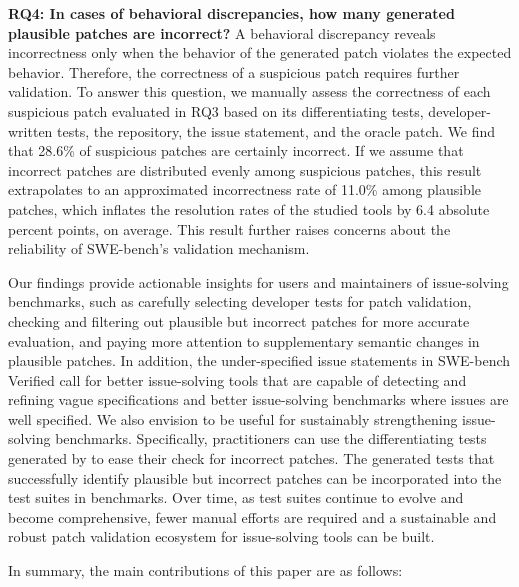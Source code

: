 \noindent \textbf{RQ4: In cases of behavioral discrepancies, how many generated plausible patches are incorrect?}
A behavioral discrepancy reveals incorrectness only when the behavior of the generated patch violates the expected behavior. 
Therefore, the correctness of a suspicious patch requires further validation.
To answer this question, 
we manually assess the correctness of each suspicious patch evaluated in RQ3 based on its differentiating tests, developer-written tests, the repository, the issue statement, and the oracle patch. 
We find that 28.6\% of suspicious patches are certainly incorrect.
If we assume that incorrect patches are distributed evenly among suspicious patches, this result extrapolates to an approximated incorrectness rate of 11.0\% among plausible patches, which inflates the resolution rates of the studied tools by 6.4 absolute percent points, on average.
This result further raises concerns about the reliability of SWE-bench's validation mechanism. 

Our findings provide actionable insights for users and maintainers of issue-solving benchmarks, such as carefully selecting developer tests for patch validation, checking and filtering out plausible but incorrect patches for more accurate evaluation, and paying more attention to supplementary semantic changes in plausible patches.
In addition, the under-specified issue statements in SWE-bench Verified call for better issue-solving tools that are capable of detecting and refining vague specifications and better issue-solving benchmarks where issues are well specified.
We also envision \appname to be useful for sustainably strengthening issue-solving benchmarks.
Specifically, practitioners can use the differentiating tests generated by \appname to ease their check for incorrect patches.
The generated tests that successfully identify plausible but incorrect patches can be incorporated into the test suites in benchmarks.
Over time, as test suites continue to evolve and become comprehensive, fewer manual efforts are required and a sustainable and robust patch validation ecosystem for issue-solving tools can be built.


In summary, the main contributions of this paper are as follows:

\vspace{-2pt}

